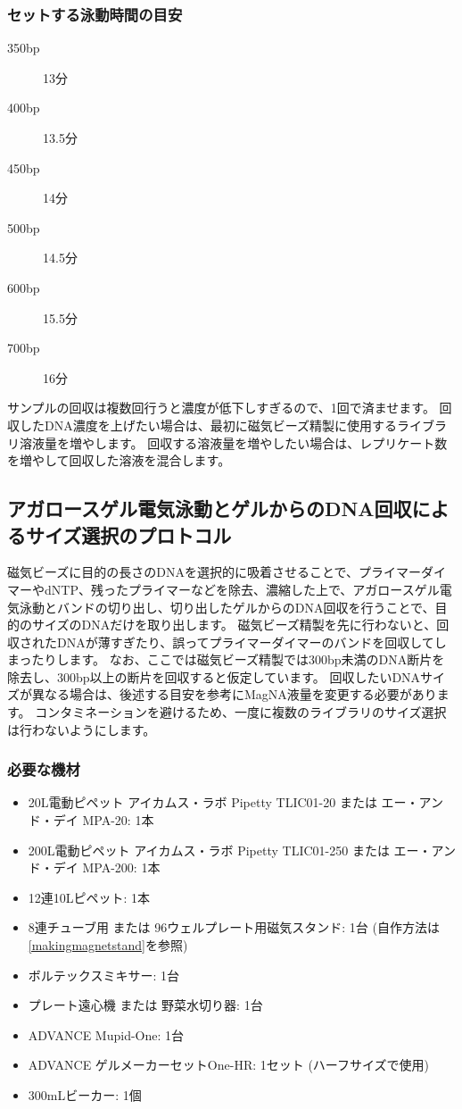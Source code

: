 \documentclass[titlepage,10pt,a4paper,uplatex]{jsbook}
\begin{document}
\subsubsection{セットする泳動時間の目安}
\begin{description}
\item[350bp] 13分
\item[400bp] 13.5分
\item[450bp] 14分
\item[500bp] 14.5分
\item[600bp] 15.5分
\item[700bp] 16分
\end{description}

サンプルの回収は複数回行うと濃度が低下しすぎるので、1回で済ませます。
回収したDNA濃度を上げたい場合は、最初に磁気ビーズ精製に使用するライブラリ溶液量を増やします。
回収する溶液量を増やしたい場合は、レプリケート数を増やして回収した溶液を混合します。

\subsection{アガロースゲル電気泳動とゲルからのDNA回収によるサイズ選択のプロトコル}

磁気ビーズに目的の長さのDNAを選択的に吸着させることで、プライマーダイマーやdNTP、残ったプライマーなどを除去、濃縮した上で、アガロースゲル電気泳動とバンドの切り出し、切り出したゲルからのDNA回収を行うことで、目的のサイズのDNAだけを取り出します。
磁気ビーズ精製を先に行わないと、回収されたDNAが薄すぎたり、誤ってプライマーダイマーのバンドを回収してしまったりします。
なお、ここでは磁気ビーズ精製では300bp未満のDNA断片を除去し、300bp以上の断片を回収すると仮定しています。
回収したいDNAサイズが異なる場合は、後述する目安を参考にMagNA液量を変更する必要があります。
コンタミネーションを避けるため、一度に複数のライブラリのサイズ選択は行わないようにします。

\subsubsection{必要な機材}
\begin{itemize}
\item 20{\textmu}L電動ピペット アイカムス・ラボ Pipetty TLIC01-20 または エー・アンド・デイ MPA-20: 1本
\item 200{\textmu}L電動ピペット アイカムス・ラボ Pipetty TLIC01-250 または エー・アンド・デイ MPA-200: 1本
\item 12連10{\textmu}Lピペット: 1本
\item 8連チューブ用 または 96ウェルプレート用磁気スタンド: 1台 (自作方法は\ref{makingmagnetstand}を参照)
\item ボルテックスミキサー: 1台
\item プレート遠心機 または 野菜水切り器: 1台
\item ADVANCE Mupid-One: 1台
\item ADVANCE ゲルメーカーセットOne-HR: 1セット (ハーフサイズで使用)
\item 300mLビーカー: 1個
\end{itemize}
\end{document}
